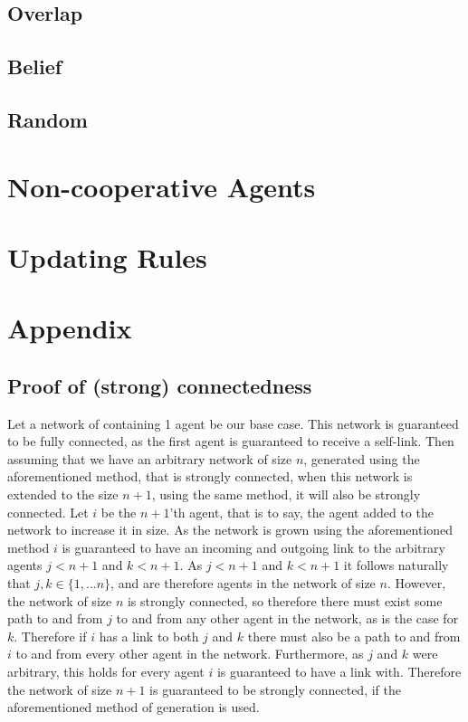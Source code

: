 \documentclass{article}
\begin{document}
\subsection{Overlap}
\subsection{Belief}
\subsection{Random}

\section{Non-cooperative Agents}

\section{Updating Rules}
\newpage
\section{Appendix}
\subsection{Proof of (strong) connectedness}
Let a network of containing 1 agent be our base case. This network is guaranteed to be fully connected, as the first agent is guaranteed to receive a self-link. Then assuming that we have an arbitrary network of size $n$, generated using the aforementioned method, that is strongly connected, when this network is extended to the size $n+1$, using the same method, it will also be strongly connected. Let $i$ be the $n+1$'th agent, that is to say, the agent added to the network to increase it in size. As the network is grown using the aforementioned method $i$ is guaranteed to have an incoming and outgoing link to the arbitrary agents $j < n+1$ and $k < n+1$. As $j < n+1$ and $k < n+1$ it follows naturally that $j, k \in \{1, ... n\}$, and are therefore agents in the network of size $n$. However, the network of size $n$ is strongly connected, so therefore there must exist some path to and from $j$ to and from any other agent in the network, as is the case for $k$. Therefore if $i$ has a link to both $j$ and $k$ there must also be a path to and from $i$ to and from every other agent in the network. Furthermore, as $j$ and $k$ were arbitrary, this holds for every agent $i$ is guaranteed to have a link with. Therefore the network of size $n+1$ is guaranteed to be strongly connected, if the aforementioned method of generation is used.\newline

\newpage
\end{document}
